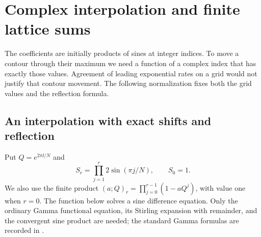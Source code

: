 \section{Complex interpolation and finite lattice sums}\label{ca:factorial-section}

The coefficients are initially products of sines at integer indices.
To move a contour through their maximum we need a function of a complex
index that has exactly those values. Agreement of leading exponential
rates on a grid would not justify that contour movement. The following
normalization fixes both the grid values and the reflection formula.

\subsection{An interpolation with exact shifts and reflection}

Put
$Q=e^{2\pi\ii/N}$ and
\[
 S_r=\prod_{j=1}^r2\sin(\pi j/N),\qquad S_0=1.
\]
We also use the finite product
$(a;Q)_r=\prod_{j=0}^{r-1}(1-aQ^j)$, with value one when $r=0$.
The function below solves a sine difference equation. Only the ordinary Gamma functional equation, its Stirling expansion with remainder, and the convergent sine product are needed; the standard Gamma formulas are recorded in \cite[\S\S5.5(i), 5.11(i)--(ii)]{DLMF}.

